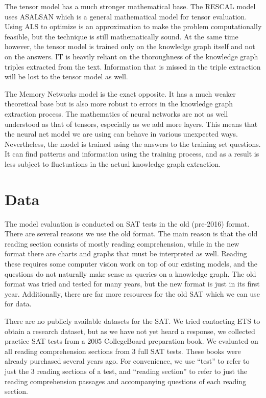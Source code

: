 \documentclass[pageno]{final_paper}
\begin{document}
The tensor model has a much stronger mathematical base. The RESCAL model uses
ASALSAN \cite{Bader2007} which is a general mathematical model for tensor
evaluation. Using ALS to optimize is an approximation to make the problem
computationally feasible, but the technique is still mathematically sound. At
the same time however, the tensor model is trained only on the knowledge graph
itself and not on the answers. IT is heavily reliant on the thoroughness of the
knowledge graph triples extracted from the text. Information that is missed in
the triple extraction will be lost to the tensor model as well.

The Memory Networks model is the exact opposite. It has a much weaker
theoretical base but is also more robust to errors in the knowledge graph
extraction process. The mathematics of neural networks are not as well
understood as that of tensors, especially as we add more layers. This means that
the neural net model we are using can behave in various unexpected ways.
Nevertheless, the model is trained using the answers to the training set
questions. It can find patterns and information using the training process, and
as a result is less subject to fluctuations in the actual knowledge graph
extraction.

\section{Data}
\label{Data}

The model evaluation is conducted on SAT tests in the old (pre-2016) format.
There are several reasons we use the old format. The main reason is that the old
reading section consists of mostly reading comprehension, while in the new
format there are charts and graphs that must be interpreted as well. Reading
these requires some computer vision work on top of our existing models, and the
questions do not naturally make sense as queries on a knowledge graph. The old
format was tried and tested for many years, but the new format is just in its
first year. Additionally, there are far more resources for the old SAT which we
can use for data.

There are no publicly available datasets for the SAT. We tried contacting ETS to
obtain a research dataset, but as we have not yet heard a response, we collected
practice SAT tests from a 2005 CollegeBoard preparation book. We evaluated on
all reading comprehension sections from 3 full SAT tests. These books were
already purchased several years ago. For convenience, we use ``test'' to refer
to just the 3 reading sections of a test, and ``reading section'' to refer to
just the reading comprehension passages and accompanying questions of each
reading section.
\end{document}
